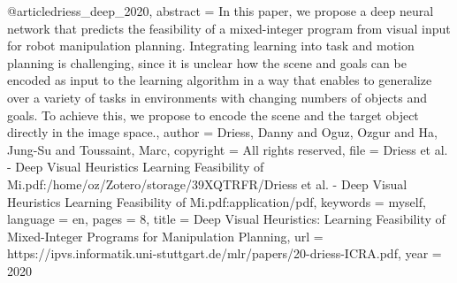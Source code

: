 @article{driess_deep_2020,
 abstract = {In this paper, we propose a deep neural network that predicts the feasibility of a mixed-integer program from visual input for robot manipulation planning. Integrating learning into task and motion planning is challenging, since it is unclear how the scene and goals can be encoded as input to the learning algorithm in a way that enables to generalize over a variety of tasks in environments with changing numbers of objects and goals. To achieve this, we propose to encode the scene and the target object directly in the image space.},
 author = {Driess, Danny and Oguz, Ozgur and Ha, Jung-Su and Toussaint, Marc},
 copyright = {All rights reserved},
 file = {Driess et al. - Deep Visual Heuristics Learning Feasibility of Mi.pdf:/home/oz/Zotero/storage/39XQTRFR/Driess et al. - Deep Visual Heuristics Learning Feasibility of Mi.pdf:application/pdf},
 keywords = {myself},
 language = {en},
 pages = {8},
 title = {Deep Visual Heuristics: Learning Feasibility of Mixed-Integer Programs for Manipulation Planning},
 url = {https://ipvs.informatik.uni-stuttgart.de/mlr/papers/20-driess-ICRA.pdf},
 year = {2020}
}

